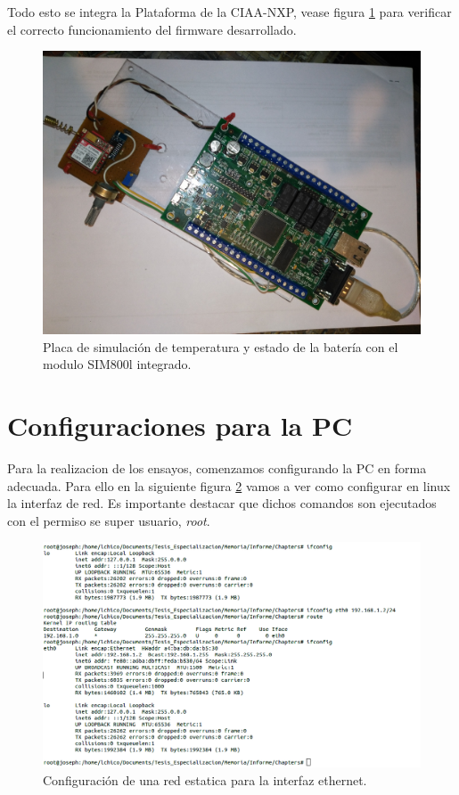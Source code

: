 Todo esto se integra la Plataforma de la CIAA-NXP, vease figura \ref{fig:prototipo} para verificar el correcto funcionamiento del firmware desarrollado.

\begin{figure}[h]
  \centering
  \includegraphics[scale=.04]{./Figures/prototipo.jpg}
  \caption{Placa de simulación de temperatura y estado de la batería con el modulo SIM800l integrado.}
  \label{fig:prototipo}
\end{figure}

\section{Configuraciones para la PC}

Para la realizacion de los ensayos, comenzamos configurando la PC en forma adecuada. Para ello en la siguiente figura \ref{fig:hw_pc} vamos a ver como configurar en linux la interfaz de red. Es importante destacar que dichos comandos son ejecutados con el permiso se super usuario, \emph{root}.

\begin{figure}[h]
  \centering
  \includegraphics[scale=.35]{./Figures/config_net_console.png}
  \caption{Configuración de una red estatica para la interfaz ethernet.}
  \label{fig:hw_pc}
\end{figure}

